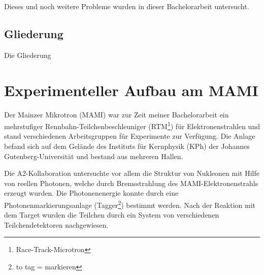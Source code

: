 \documentclass[a4paper,11pt,oneside,final,german,openbib,pdftex]{scrbook}
\begin{document}
{	Dieses und noch weitere Probleme wurden in dieser Bachelorarbeit untersucht.
	\newline	 
	
	
\section{Gliederung}

Die Gliederung




\chapter{Experimenteller Aufbau am MAMI}





Der Mainzer Mikrotron (MAMI) war zur Zeit meiner Bachelorarbeit ein mehrstufiger Rennbahn-Teilchenbeschleuniger (RTM\footnote{Race-Track-Microtron}) für Elektronenstrahlen und stand verschiedenen Arbeitsgruppen
 für Experimente zur Verfügung. Die Anlage befand sich auf dem Gelände des Instituts für Kernphysik (KPh) der Johannes Gutenberg-Universität 
und bestand aus mehreren Hallen.

Die A2-Kollaboration untersuchte vor allem die Struktur von Nukleonen mit Hilfe von reellen Photonen, welche durch Bremsstrahlung des MAMI-Elektronenstrahls erzeugt wurden. Die Photonenenergie konnte durch eine Photonenmarkierungsanlage (Tagger\footnote{to tag = markieren}) bestimmt werden. Nach der Reaktion mit dem Target wurden die Teilchen durch ein System von verschiedenen Teilchendetektoren nachgewiesen.

}
\end{document}
